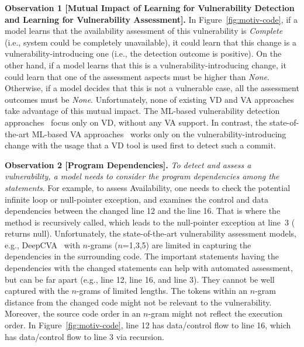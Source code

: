 \vspace{2pt}
{\bf Observation 1 [Mutual Impact of Learning for
    Vulnerability Detection and Learning for Vulnerability
    Assessment].} In Figure~\ref{fig:motiv-code}, if a model learns
that the availability assessment of this vulnerability is {\em
  Complete} (i.e., system could be completely unavailable), it could
learn that this change is a vulnerability-introducing one (i.e., the
detection outcome is positive). On the other hand, if a model learns
that this is a vulnerability-introducing change, it could learn that
one of the assessment aspects must be higher than {\em
  None}. Otherwise, if a model decides that this is not a vulnerable
case, all the assessment outcomes must be {\em None}. Unfortunately,
none of existing VD and VA approaches take advantage of this mutual
impact. The ML-based vulnerability detection
approaches~\cite{perl2015vccfinder,zhou2017automated,chen2019large}
focus only on VD, without any VA support. In contrast, the
state-of-the-art ML-based VA approaches~\cite{deepCVA-ase21}
works only on the vulnerability-introducing change with the usage
that a VD tool is used first to detect such a commit.

\vspace{2pt}
{\bf Observation 2 [Program Dependencies].}  {\em To detect
  and assess a vulnerability, a model needs to consider the program
  dependencies among the statements}. For example, to assess
Availability, one needs to check the potential infinite loop or
null-pointer exception, and examines the control and data dependencies
between the changed line 12 and the line 16. That is where the method
 is recursively called, which leads to the null-pointer
exception at line~3 ( returns
null). Unfortunately, the state-of-the-art vulnerability assessment
models, e.g., DeepCVA~\cite{deepCVA-ase21} with $n$-grams ($n$=1,3,5)
are limited in capturing the dependencies in the surrounding code. The
important statements having the dependencies with the changed
statements can help with automated assessment, but can be far apart
(e.g., line 12, line 16, and line 3). They cannot be well captured
with the $n$-grams of limited lengths. The tokens within an $n$-gram
distance from the changed code might not be relevant to the
vulnerability. Moreover, the source code order in an $n$-gram might
not reflect the execution order. In Figure~\ref{fig:motiv-code}, line
12 has data/control flow to line 16, which has data/control flow to
line 3 via recursion.

